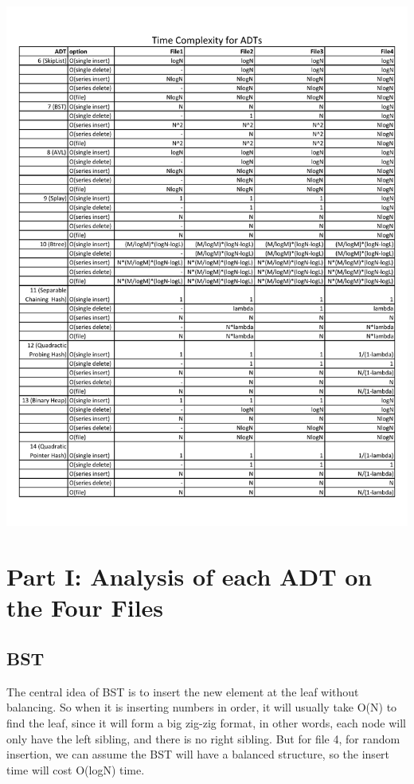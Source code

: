 \documentclass[]{article}
\begin{document}
\includegraphics{timetest2_time_complexity}

\section{Part I: Analysis of each ADT on the Four
Files}\label{part-i-analysis-of-each-adt-on-the-four-files}

\subsection{BST}\label{bst}

The central idea of BST is to insert the new element at the leaf without
balancing. So when it is inserting numbers in order, it will usually
take O(N) to find the leaf, since it will form a big zig-zig format, in
other words, each node will only have the left sibling, and there is no
right sibling. But for file 4, for random insertion, we can assume the
BST will have a balanced structure, so the insert time will cost O(logN)
time.
\end{document}
